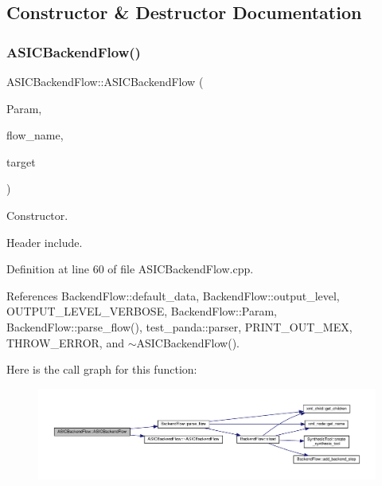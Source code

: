 \subsection{Constructor \& Destructor Documentation}
\mbox{\label{classASICBackendFlow_ac2e7ed2ec6418916f904d43fb2c9dcd0}} 
\subsubsection{\texorpdfstring{A\+S\+I\+C\+Backend\+Flow()}{ASICBackendFlow()}}
{\footnotesize\ttfamily A\+S\+I\+C\+Backend\+Flow\+::\+A\+S\+I\+C\+Backend\+Flow (\begin{DoxyParamCaption}\item[{const \hyperlink{Parameter_8hpp_a37841774a6fcb479b597fdf8955eb4ea}{Parameter\+Const\+Ref}}]{Param,  }\item[{const std\+::string \&}]{flow\+\_\+name,  }\item[{const \hyperlink{target__manager_8hpp_aee0b586a84fb6eb4faefa6e41e1735a9}{target\+\_\+manager\+Ref}}]{target }\end{DoxyParamCaption})}



Constructor. 

Header include. 

Definition at line 60 of file A\+S\+I\+C\+Backend\+Flow.\+cpp.



References Backend\+Flow\+::default\+\_\+data, Backend\+Flow\+::output\+\_\+level, O\+U\+T\+P\+U\+T\+\_\+\+L\+E\+V\+E\+L\+\_\+\+V\+E\+R\+B\+O\+SE, Backend\+Flow\+::\+Param, Backend\+Flow\+::parse\+\_\+flow(), test\+\_\+panda\+::parser, P\+R\+I\+N\+T\+\_\+\+O\+U\+T\+\_\+\+M\+EX, T\+H\+R\+O\+W\+\_\+\+E\+R\+R\+OR, and $\sim$\+A\+S\+I\+C\+Backend\+Flow().

Here is the call graph for this function\+:
\nopagebreak
\begin{figure}[H]
\begin{center}
\leavevmode
\includegraphics[width=350pt]{d2/d69/classASICBackendFlow_ac2e7ed2ec6418916f904d43fb2c9dcd0_cgraph}
\end{center}
\end{figure}
\mbox{\label{classASICBackendFlow_abc8ca0ae73028f5617092d16f147f1e8}} 
